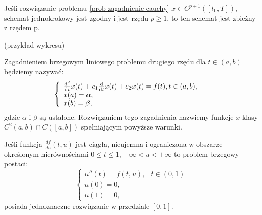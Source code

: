 \documentclass[notheorems]{beamer}
\begin{document}
\begin{frame}
\begin{theorem} \label{theorem-convergence-one-step-schema} 
Jeśli rozwiązanie problemu \ref{prob-zagadnienie-cauchy} $x \in C^{p+1}([t_0,T])$, schemat jednokrokowy jest zgodny i jest rzędu $p\geqslant1$, to ten schemat jest zbieżny z rzędem p. 
\end{theorem}
\end{frame}
\begin{frame} 
(przykład wykresu)
\end{frame}
\begin{frame}
\begin{definition}
Zagadnieniem brzegowym liniowego problemu drugiego rzędu dla $ t \in (a,b) $ będziemy nazywać:
\begin{equation}
\left\{\begin{array}{ll}
\ddx [^2]{t} x(t) + c_1\ddx{t} x(t) + c_2x(t) = f(t), t \in (a,b), & \\
x(a) = \alpha, & \\
x(b) = \beta ,&
\end{array} \right.
\end{equation}
gdzie $\alpha$ i $\beta$ są ustalone. Rozwiązaniem tego zagadnienia nazwiemy funkcje $x$ klasy $C^2(a,b) \cap C([a,b])$ spełniającym powyższe warunki.
\end{definition}
\end{frame}
\begin{frame}
\begin{theorem}
Jeśli funkcja $\frac{df}{du}(t,u)$ jest ciągła, nieujemna i ograniczona w obszarze określonym nierównościami $0\leq t \leq 1$, $-\infty < u < +\infty$ to problem brzegowy postaci:
\begin{equation}\label{zagad_brzeg}
\left\{\begin{array}{ll}
u''(t)=f(t,u), & t \in (0,1) \\
u(0)=0, & \\
u(1)=0,
\end{array}\right.
\end{equation}
posiada jednoznaczne rozwiązanie w przedziale $[0,1]$.
\end{theorem}
\end{frame}
\end{document}
